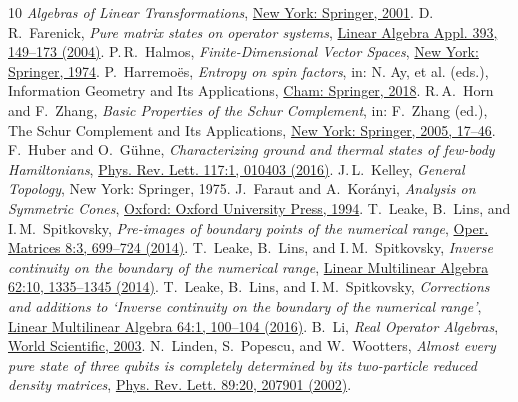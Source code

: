 \documentclass[a4paper,11pt,reqno]{amsart}
\theoremstyle{definition}
\theoremstyle{remark}
\numberwithin{equation}{section}
\begin{document}
\begin{thebibliography}{10}
\emph{Algebras of Linear Transformations}, 
\href{https://doi.org/10.1007/978-1-4613-0097-7}%
{New York: Springer, 2001}.
%
D.\,R.~Farenick, 
\emph{Pure matrix states on operator systems},
\href{https://doi.org/j.laa.2004.06.020}%
{Linear Algebra Appl. 393, 149--173 (2004)}.
%
P.\,R.~Halmos, 
\emph{Finite-Dimensional Vector Spaces},
\href{https://doi.org/10.1007/978-1-4612-6387-6}%
{New York: Springer, 1974}.
%
P.~Harremo\"es, 
\emph{Entropy on spin factors},
in: N. Ay, et al. (eds.), Information Geometry and Its Applications,
\href{https://doi.org/10.1007/978-3-319-97798-0_9}%
{Cham: Springer, 2018}.
%
R.\,A.~Horn and F.~Zhang, 
\emph{Basic Properties of the Schur Complement},
in: F.~Zhang (ed.), The Schur Complement and Its Applications,
\href{https://doi.org/10.1007/0-387-24273-2_2}%
{New York: Springer, 2005, 17--46}. 
%
F.~Huber and O.~G\"{u}hne, 
\emph{Characterizing ground and thermal states of few-body Hamiltonians},
\href{https://doi.org/10.1103/PhysRevLett.117.010403}%
{Phys. Rev. Lett. 117:1, 010403 (2016)}.
%
J.\,L.~Kelley, 
\emph{General Topology},
New York: Springer, 1975.
%
J.~Faraut and A.~Kor\'{a}nyi, 
\emph{Analysis on Symmetric Cones}, 
\href{https://doi.org/10.1093/oso/9780198534778.001.0001}%
{Oxford: Oxford University Press, 1994}.
%
T.~Leake, B.~Lins, and I.\,M.~Spitkovsky, 
\emph{Pre-images of boundary points of the numerical range},
\href{https://doi.org/10.7153/oam-08-39}%
{Oper. Matrices 8:3, 699--724 (2014)}.
%
T.~Leake, B.~Lins, and I.\,M.~Spitkovsky, 
\emph{Inverse continuity on the boundary of the numerical range},
\href{https://doi.org/10.1080/03081087.2013.825911}%
{Linear Multilinear Algebra 62:10, 1335--1345 (2014)}.
%
T.~Leake, B.~Lins, and I.\,M.~Spitkovsky,  
\emph{Corrections and additions to `Inverse continuity on the boundary of 
the numerical range'}, 
\href{https://doi.org/10.1080/03081087.2015.1044247}%
{Linear Multilinear Algebra 64:1, 100--104 (2016)}.
%
B.~Li, 
\emph{Real Operator Algebras},
\href{https://doi.org/10.1142/5284}%
{World Scientific, 2003}.
%
N.~Linden, S.~Popescu, and W.~Wootters, 
\emph{Almost every pure state of three qubits is completely determined 
by its two-particle reduced density matrices},
\href{https://doi.org/10.1103/PhysRevLett.89.207901}%
{Phys. Rev. Lett. 89:20, 207901 (2002)}.

\end{thebibliography}
\end{document}

